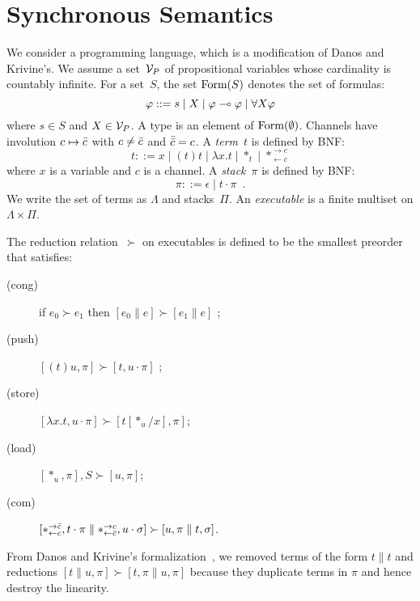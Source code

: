 

\section{Synchronous Semantics}


\newcommand{\conc}{\parallel}
\newcommand{\comod}[2]{\ast^{\rightarrow {#2}}_{\leftarrow{#1}}}
\newcommand{\reader}[1]{\ast_{\leftarrow{#1}}}

We consider a programming language, which is a modification of
Danos and Krivine's.
We assume a set~$\mathcal V_P$ of propositional variables whose cardinality is
countably infinite.
For a set~$S$,
the set $\mathop{\text{Form}}(S)$ denotes the set of formulas:
\[
\varphi::= s \mid X \mid \varphi\multimap\varphi\mid \forall X \varphi
\]
where $s\in S$ and $X\in \mathcal V_P$.
A type is an element of $\mathop{\text{Form}}(\emptyset)$.
Channels have involution $c\mapsto\bar{c}$ with
$c\neq \bar{c}$ and
$\bar{\bar{c}} = c$.
A \textit{term}~$t$ is defined by BNF:
\[
 t::= x
 \mid (t)t
 \mid \lambda x.t
 \mid \ast_t
 \mid \comod c c
\]
where $x$ is a variable and $c$ is a channel.
A \textit{stack}~$\pi$ is defined by BNF:
\[
 \pi ::= \epsilon
 \mid t\cdot \pi
 \enspace.
\]
We write the set of terms as $\Lambda$ and stacks~$\Pi$.
An \textit{executable} is a finite multiset on $\Lambda \times \Pi$.

\newcommand{\red}{\succ}
The reduction relation~$\red$ on executables
is defined to be the smallest preorder
that satisfies:
\begin{description}
 \item[(cong)] if
	    $e_0         \red e_1$
	    then
	    $[e_0 \conc e] \red [ e_1\conc e]$  \enspace;
 \item[(push)]
	    $[(t)u,\pi]      \red [t,u\cdot\pi]$      \enspace;
 \item[(store)]
	    $[\lambda x.t,u\cdot\pi]
	     \red
	     [t[\ast_u/x],      \pi]$\enspace;
 \item[(load)]
	    $[\ast_u,\pi],S\red[u,\pi]$\enspace;
 \item[(com)]
	    $[\comod c{\co c}, t\cdot\pi\conc \comod{\co c}c,
	    u\cdot\sigma] \red
	    [u,\pi\conc t,\sigma]$\enspace.
\end{description}
From Danos and Krivine's formalization~,
we removed terms of the form $ t\conc t $ and
reductions
	    $[t\conc u,\pi]  \red [t,\pi\conc u,\pi]$
because they duplicate terms in $\pi$ and hence destroy the linearity.


